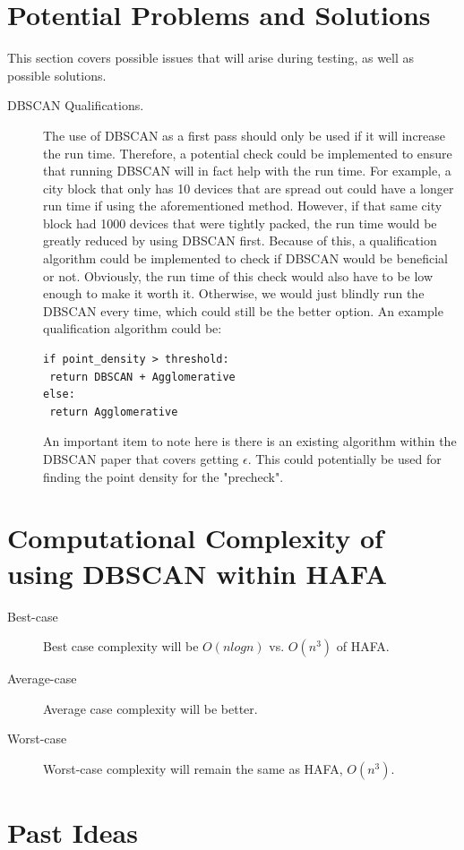 \documentclass[letterpaper,twocolumn,10pt]{article}
\begin{document}
\section{Potential Problems and Solutions}
This section covers possible issues that will arise during testing, as well as possible solutions.
\begin{description}
\item[DBSCAN Qualifications.] The use of DBSCAN as a first pass should only be used if it will increase the run time. Therefore, a potential check could be implemented to ensure that running DBSCAN will in fact help with the run time. For example, a city block that only has 10 devices that are spread out could have a longer run time if using the aforementioned method. However, if that same city block had 1000 devices that were tightly packed, the run time would be greatly reduced by using DBSCAN first. Because of this, a qualification algorithm could be implemented to check if DBSCAN would be beneficial or not. Obviously, the run time of this check would also have to be low enough to make it worth it. Otherwise, we would just blindly run the DBSCAN every time, which could still be the better option. An example qualification algorithm could be:
\begin{verbatim}
if point_density > threshold:
 return DBSCAN + Agglomerative
else:
 return Agglomerative
\end{verbatim}
An important item to note here is there is an existing algorithm within the DBSCAN paper that covers getting $\epsilon$. This could potentially be used for finding the point density for the "precheck".
\end{description}

\section{Computational Complexity of using DBSCAN within HAFA}

\begin{description}
\item[Best-case] Best case complexity will be $O (n log n)$ vs. $O(n^3)$ of HAFA.
\item[Average-case] Average case complexity will be better.
\item[Worst-case] Worst-case complexity will remain the same as HAFA, $O(n^3)$.
\end{description}

\section{Past Ideas}
\end{document}
